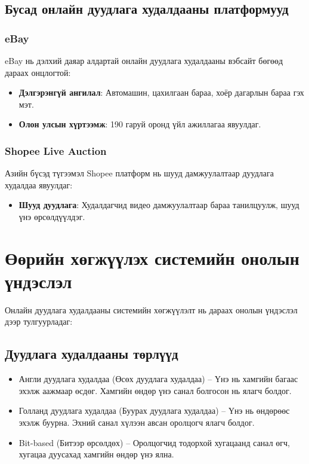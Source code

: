 \subsection{Бусад онлайн дуудлага худалдааны платформууд}
\subsubsection{eBay}
eBay \cite{ebay} нь дэлхий даяар алдартай онлайн дуудлага худалдааны вэбсайт бөгөөд дараах онцлогтой:

\begin{itemize}
    \item \textbf{Дэлгэрэнгүй ангилал}: Автомашин, цахилгаан бараа, хоёр дагарлын бараа гэх мэт.
    \item \textbf{Олон улсын хүртээмж}: 190 гаруй оронд үйл ажиллагаа явуулдаг.
\end{itemize}


\subsubsection{Shopee Live Auction}
Азийн бүсэд түгээмэл Shopee \cite{shopeeliveauction} платформ нь шууд дамжуулалтаар дуудлага худалдаа явуулдаг:

\begin{itemize}
    \item \textbf{Шууд дуудлага}: Худалдагчид видео дамжуулалтаар бараа танилцуулж, шууд үнэ өрсөлдүүлдэг.

\end{itemize}
\section{Өөрийн хөгжүүлэх системийн онолын үндэслэл}
Онлайн дуудлага худалдааны системийн хөгжүүлэлт нь дараах онолын үндэслэл дээр тулгуурладаг:

\subsection{Дуудлага худалдааны төрлүүд}
\begin{itemize}
\item  Англи дуудлага худалдаа \cite{aljaf2016online} (Өсөх дуудлага худалдаа) – Үнэ нь хамгийн багаас эхэлж аажмаар өсдөг. Хамгийн өндөр үнэ санал болгосон нь ялагч болдог.

\item  Голланд дуудлага худалдаа (Буурах дуудлага худалдаа) – Үнэ нь өндөрөөс эхэлж буурна. Эхний санал хүлээн авсан оролцогч ялагч болдог.
\item Bit-based (Битээр өрсөлдөх) – Оролцогчид тодорхой хугацаанд санал өгч, хугацаа дуусахад хамгийн өндөр үнэ ялна.
\end{itemize}



